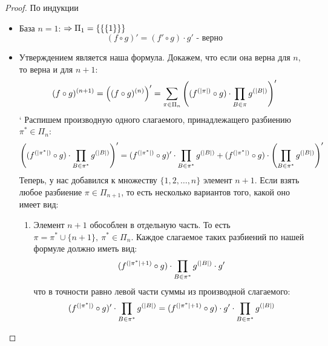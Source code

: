 \begin{proof}
	По индукции
	\begin{itemize}
		\item База $n = 1$: $\Rightarrow \Pi_1 = \{\{\{1\}\}\}$
		\[
			(f \circ g)' = (f' \circ g) \cdot g' \text{ - верно}
		\]
		
		\item Утверждением является наша формула. Докажем, что если она верна для $n$, то верна и для $n + 1$:
		\[
			(f \circ g)^{(n + 1)} = \left((f \circ g)^{(n)}\right)' = \sum\limits_{\pi \in \Pi_n} \left((f^{(|\pi|)} \circ g) \cdot \prod\limits_{B \in \pi} g^{(|B|)}\right)'
		\]`
		Распишем производную одного слагаемого, принадлежащего разбиению $\pi^* \in \Pi_n$:
		\[
			\left((f^{(|\pi^*|)} \circ g) \cdot \prod\limits_{B \in \pi^*} g^{(|B|)}\right)' = (f^{(|\pi^*|)} \circ g)' \cdot \prod\limits_{B \in \pi^*} g^{(|B|)} + (f^{(|\pi^*|)} \circ g) \cdot \left(\prod\limits_{B \in \pi^*} g^{(|B|)}\right)'
		\]
		Теперь, у нас добавился к множеству $\{1, 2, \dots, n\}$ элемент $n + 1$. Если взять любое разбиение $\pi \in \Pi_{n + 1}$, то есть несколько вариантов того, какой оно имеет вид:
		\begin{enumerate}
			\item Элемент $n + 1$ обособлен в отдельную часть. То есть $\pi = \pi^* \cup \{n + 1\},\ \pi^* \in \Pi_n$. Каждое слагаемое таких разбиений по нашей формуле должно иметь вид:
			\[
				(f^{(|\pi^*| + 1)} \circ g) \cdot \prod\limits_{B \in \pi^*} g^{(|B|)} \cdot g'
			\]
			что в точности равно левой части суммы из производной слагаемого:
			\[
				(f^{(|\pi^*|)} \circ g)' \cdot \prod\limits_{B \in \pi^*} g^{(|B|)} = (f^{(|\pi^*| + 1)} \circ g) \cdot g' \cdot \prod\limits_{B \in \pi^*} g^{(|B|)}
			\]
			

\end{enumerate}
\end{itemize}
\end{proof}

